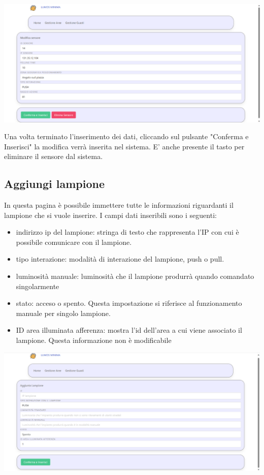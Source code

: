 \documentclass[9pt]{article}
\begin{document}
\begin{itemize}
\begin{center}
	\includegraphics[scale=0.3]{Modifica_sensore.png}
\end{center}

Una volta terminato l'inserimento dei dati, cliccando sul pulsante "Conferma e Inserisci"
la modifica verrà inserita nel sistema.
E' anche presente il tasto per eliminare il sensore dal sistema.


\subsection{Aggiungi lampione}
In questa pagina è possibile immettere tutte le informazioni riguardanti il lampione che si vuole inserire.
I campi dati inseribili sono i seguenti:
\begin{itemize}
	\item indirizzo ip del lampione: stringa di testo che rappresenta l'IP con cui è possibile comunicare con il lampione.
	\item tipo interazione: modalità di interazione del lampione, push o pull.
	\item luminosità manuale: luminosità che il lampione produrrà quando comandato singolarmente
	\item stato: acceso o spento. Questa impostazione si riferisce al funzionamento manuale per singolo lampione.
	\item ID area illuminata afferenza: mostra l'id dell'area a cui viene associato il lampione. Questa informazione non è modificabile
\end{itemize}


\begin{center}
	\includegraphics[scale=0.3]{Aggiungi_lampione.png}
\end{center}


\end{itemize}
\end{document}

